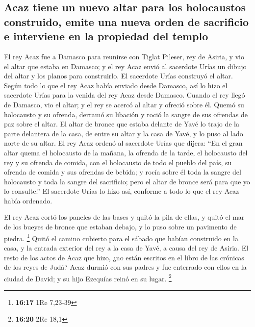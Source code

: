\begin{paracol}{2}
\hypertarget{acaz-tiene-un-nuevo-altar-para-los-holocaustos-construido-emite-una-nueva-orden-de-sacrificio-e-interviene-en-la-propiedad-del-templo}{%
\subsection{Acaz tiene un nuevo altar para los holocaustos construido,
emite una nueva orden de sacrificio e interviene en la propiedad del
templo}\label{acaz-tiene-un-nuevo-altar-para-los-holocaustos-construido-emite-una-nueva-orden-de-sacrificio-e-interviene-en-la-propiedad-del-templo}}

 El rey Acaz fue a Damasco para reunirse con Tiglat
Pileser, rey de Asiria, y vio el altar que estaba en Damasco; y el rey
Acaz envió al sacerdote Urías un dibujo del altar y los planos para
construirlo.  El sacerdote Urías construyó el altar.
Según todo lo que el rey Acaz había enviado desde Damasco, así lo hizo
el sacerdote Urías para la venida del rey Acaz desde Damasco.
 Cuando el rey llegó de Damasco, vio el altar; y el rey
se acercó al altar y ofreció sobre él.  Quemó su
holocausto y su ofrenda, derramó su libación y roció la sangre de sus
ofrendas de paz sobre el altar.  El altar de bronce que
estaba delante de Yavé lo trajo de la parte delantera de la casa, de
entre su altar y la casa de Yavé, y lo puso al lado norte de su altar.
 El rey Acaz ordenó al sacerdote Urías que dijera: ``En
el gran altar quema el holocausto de la mañana, la ofrenda de la tarde,
el holocausto del rey y su ofrenda de comida, con el holocausto de todo
el pueblo del país, su ofrenda de comida y sus ofrendas de bebida; y
rocía sobre él toda la sangre del holocausto y toda la sangre del
sacrificio; pero el altar de bronce será para que yo lo consulte.''
 El sacerdote Urías lo hizo así, conforme a todo lo que
el rey Acaz había ordenado.

 El rey Acaz cortó los paneles de las bases y quitó la
pila de ellas, y quitó el mar de los bueyes de bronce que estaban
debajo, y lo puso sobre un pavimento de piedra. \footnote{\textbf{16:17}
  1Re 7,23-39}  Quitó el camino cubierto para el sábado
que habían construido en la casa, y la entrada exterior del rey a la
casa de Yavé, a causa del rey de Asiria.  El resto de los
actos de Acaz que hizo, ¿no están escritos en el libro de las crónicas
de los reyes de Judá?  Acaz durmió con sus padres y fue
enterrado con ellos en la ciudad de David; y su hijo Ezequías reinó en
su lugar. \footnote{\textbf{16:20} 2Re 18,1}


\end{paracol}
